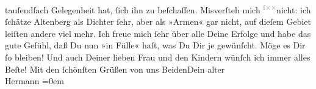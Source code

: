 \begin{ledgroupsized}[t]{13cm}
               tauſendfach Gelegenheit hat, ſich ihn zu beſchaffen. Misverſteh mich \substVorne{}\textsuperscript{\textcolor{gray}{ſ}\textcolor{gray}{×}\-\textcolor{gray}{×}}\substDazwischen{}ni\substHinten{}cht: ich ſchätze Altenberg als Dichter
               ſehr, aber als »Armen« gar nicht, auf dieſem Gebiet leiſten andere viel mehr.\pend
           \pstart
           Ich freue mich ſehr über alle Deine Erfolge und habe das gute Gefühl, daß Du nun »in
               Fülle« haſt, was Du Dir je gewünſcht. Möge es Dir ſo bleiben! Und auch Deiner lieben
                  Frau und den Kindern wünſch ich immer alles Beſte!\pend
           \pstart
           Mit den ſchönſten Grüßen von uns BeidenDein alter{\\[\baselineskip]}\spacefill\mbox{Hermann}\pend
           \leftskip=0em{}
         
         \endnumbering{}\end{ledgroupsized}  \newcommand{\dateiname}{L02107}\newcommand{\titel}{Hermann Bahr an Arthur Schnitzler, 7. 12. 1912}\newcommand{\editorInnen}{ Kurt Ifkovits,  Martin Anton Müller}
      